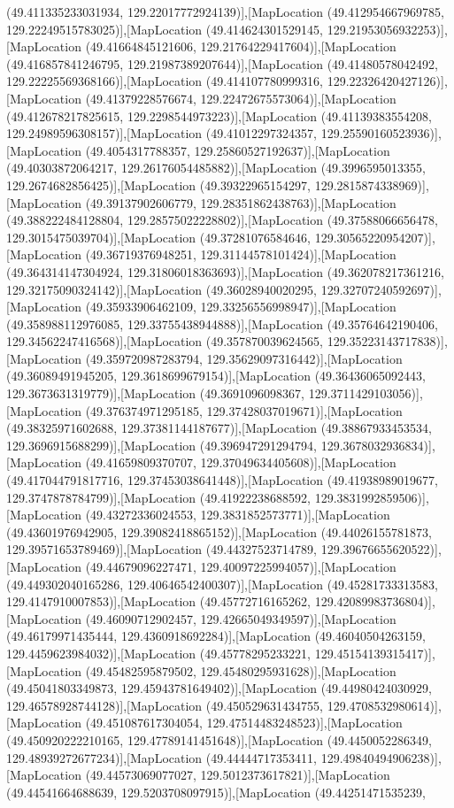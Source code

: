 (49.411335233031934, 129.22017772924139)],[MapLocation (49.412954667969785, 129.22249515783025)],[MapLocation (49.414624301529145, 129.21953056932253)],[MapLocation (49.41664845121606, 129.21764229417604)],[MapLocation (49.416857841246795, 129.21987389207644)],[MapLocation (49.41480578042492, 129.22225569368166)],[MapLocation (49.414107780999316, 129.22326420427126)],[MapLocation (49.41379228576674, 129.22472675573064)],[MapLocation (49.412678217825615, 129.2298544973223)],[MapLocation (49.41139383554208, 129.24989596308157)],[MapLocation (49.41012297324357, 129.25590160523936)],[MapLocation (49.4054317788357, 129.25860527192637)],[MapLocation (49.40303872064217, 129.26176054485882)],[MapLocation (49.3996595013355, 129.2674682856425)],[MapLocation (49.39322965154297, 129.2815874338969)],[MapLocation (49.39137902606779, 129.28351862438763)],[MapLocation (49.388222484128804, 129.28575022228802)],[MapLocation (49.37588066656478, 129.3015475039704)],[MapLocation (49.37281076584646, 129.30565220954207)],[MapLocation (49.36719376948251, 129.31144578101424)],[MapLocation (49.364314147304924, 129.31806018363693)],[MapLocation (49.362078217361216, 129.32175090324142)],[MapLocation (49.36028940020295, 129.32707240592697)],[MapLocation (49.35933906462109, 129.33256556998947)],[MapLocation (49.358988112976085, 129.33755438944888)],[MapLocation (49.35764642190406, 129.34562247416568)],[MapLocation (49.357870039624565, 129.35223143717838)],[MapLocation (49.359720987283794, 129.35629097316442)],[MapLocation (49.36089491945205, 129.3618699679154)],[MapLocation (49.36436065092443, 129.3673631319779)],[MapLocation (49.3691096098367, 129.3711429103056)],[MapLocation (49.376374971295185, 129.37428037019671)],[MapLocation (49.38325971602688, 129.37381144187677)],[MapLocation (49.38867933453534, 129.3696915688299)],[MapLocation (49.396947291294794, 129.3678032936834)],[MapLocation (49.41659809370707, 129.37049634405608)],[MapLocation (49.417044791817716, 129.37453038641448)],[MapLocation (49.41938989019677, 129.3747878784799)],[MapLocation (49.41922238688592, 129.3831992859506)],[MapLocation (49.43272336024553, 129.3831852573771)],[MapLocation (49.43601976942905, 129.39082418865152)],[MapLocation (49.44026155781873, 129.39571653789469)],[MapLocation (49.44327523714789, 129.39676655620522)],[MapLocation (49.44679096227471, 129.40097225994057)],[MapLocation (49.449302040165286, 129.40646542400307)],[MapLocation (49.45281733313583, 129.4147910007853)],[MapLocation (49.45772716165262, 129.42089983736804)],[MapLocation (49.46090712902457, 129.42665049349597)],[MapLocation (49.46179971435444, 129.4360918692284)],[MapLocation (49.46040504263159, 129.4459623984032)],[MapLocation (49.45778295233221, 129.45154139315417)],[MapLocation (49.45482595879502, 129.45480295931628)],[MapLocation (49.45041803349873, 129.45943781649402)],[MapLocation (49.44980424030929, 129.46578928744128)],[MapLocation (49.450529631434755, 129.4708532980614)],[MapLocation (49.451087617304054, 129.47514483248523)],[MapLocation (49.450920222210165, 129.47789141451648)],[MapLocation (49.4450052286349, 129.48939272677234)],[MapLocation (49.44444717353411, 129.49840494906238)],[MapLocation (49.44573069077027, 129.5012373617821)],[MapLocation (49.44541664688639, 129.5203708097915)],[MapLocation (49.44251471535239, 